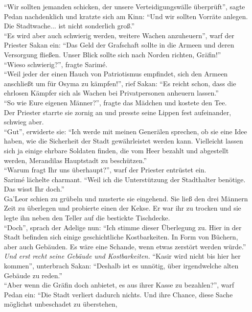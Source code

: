 ``Wir sollten jemanden schicken, der unsere Verteidigungswälle überprüft'', sagte Pedan 
nachdenklich und kratzte sich am Kinn: ``Und wir sollten Vorräte anlegen. Die Stadtwache... ist 
nicht sonderlich groß.''\\
``Es wird aber auch schwierig werden, weitere Wachen anzuheuern'', warf der Priester Sakan ein: 
``Das Geld der Grafschaft sollte in die Armeen und deren Versorgung fließen. Unser Blick sollte 
sich nach Norden richten, Gräfin!''\\
``Wieso schwierig?'', fragte Sarimé.\\
``Weil jeder der einen Hauch von Patriotismus empfindet, sich den Armeen anschließt um für Osyma zu 
kämpfen!'', rief Sakan: ``Es reicht schon, dass die ehrlosen Kämpfer sich als Wachen bei 
Privatpersonen anheuern lassen.''\\
``So wie Eure eigenen Männer?'', fragte das Mädchen und kostete den Tee.\\
Der Priester starrte sie zornig an und presste seine Lippen fest aufeinander, schwieg aber.\\
``Gut'', erwiderte sie: ``Ich werde mit meinen Generälen sprechen, ob sie eine Idee haben, wie die 
Sicherheit der Stadt gewährleistet werden kann. Vielleicht lassen sich ja einige ehrbare Soldaten 
finden, die vom Heer bezahlt und abgestellt werden, Merandilas Hauptstadt zu beschützen.''\\
``Warum fragt Ihr uns überhaupt?'', warf der Priester entrüstet ein.\\
Sarimé lächelte charmant. ``Weil ich die Unterstützung der Stadthalter benötige. Das wisst Ihr 
doch.''\\
Ga'Leor schien zu grübeln und musterte sie eingehend. Sie ließ den drei Männern Zeit zu überlegen 
und probierte einen der Kekse. Er war ihr zu trocken und sie legte ihn neben den Teller auf die 
bestickte Tischdecke.\\
``Doch'', sprach der Adelige nun: ``Ich stimme dieser Überlegung zu. Hier in der Stadt befinden 
sich einige geschichtliche Kostbarkeiten. In Form von Büchern, aber auch Gebäuden. Es wäre eine 
Schande, wenn etwas zerstört werden würde.''\\
\textit{Und erst recht seine Gebäude und Kostbarkeiten.}
``Kasir wird nicht bis hier her kommen'', unterbrach Sakan: ``Deshalb ist es unnötig, über 
irgendwelche alten Gebäude zu reden.''\\
``Aber wenn die Gräfin doch anbietet, es aus ihrer Kasse zu bezahlen?'', warf Pedan ein: ``Die 
Stadt verliert dadurch nichts. Und ihre Chance, diese Sache möglichst unbeschadet zu überstehen, 
